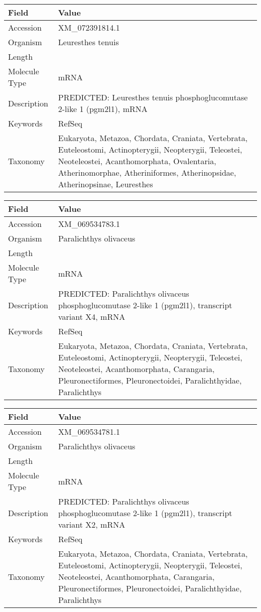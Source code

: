 \documentclass[10pt]{article}
\begin{document}
{\footnotesize
\begin{longtable}{>{\raggedright\arraybackslash}p{4.5cm} >{\raggedright\arraybackslash}p{11.5cm}}
\textbf{Field} & \textbf{Value} \\
\hline
Accession & XM\_072391814.1 \\
Organism & Leuresthes tenuis \\
Length & 3585 \\
Molecule Type & mRNA \\
Description & PREDICTED: Leuresthes tenuis phosphoglucomutase 2-like 1 (pgm2l1), mRNA \\
Keywords & RefSeq \\
Taxonomy & Eukaryota, Metazoa, Chordata, Craniata, Vertebrata, Euteleostomi, Actinopterygii, Neopterygii, Teleostei, Neoteleostei, Acanthomorphata, Ovalentaria, Atherinomorphae, Atheriniformes, Atherinopsidae, Atherinopsinae, Leuresthes \\
\end{longtable}
}

{\footnotesize
\begin{longtable}{>{\raggedright\arraybackslash}p{4.5cm} >{\raggedright\arraybackslash}p{11.5cm}}
\textbf{Field} & \textbf{Value} \\
\hline
Accession & XM\_069534783.1 \\
Organism & Paralichthys olivaceus \\
Length & 3057 \\
Molecule Type & mRNA \\
Description & PREDICTED: Paralichthys olivaceus phosphoglucomutase 2-like 1 (pgm2l1), transcript variant X4, mRNA \\
Keywords & RefSeq \\
Taxonomy & Eukaryota, Metazoa, Chordata, Craniata, Vertebrata, Euteleostomi, Actinopterygii, Neopterygii, Teleostei, Neoteleostei, Acanthomorphata, Carangaria, Pleuronectiformes, Pleuronectoidei, Paralichthyidae, Paralichthys \\
\end{longtable}
}

{\footnotesize
\begin{longtable}{>{\raggedright\arraybackslash}p{4.5cm} >{\raggedright\arraybackslash}p{11.5cm}}
\textbf{Field} & \textbf{Value} \\
\hline
Accession & XM\_069534781.1 \\
Organism & Paralichthys olivaceus \\
Length & 3167 \\
Molecule Type & mRNA \\
Description & PREDICTED: Paralichthys olivaceus phosphoglucomutase 2-like 1 (pgm2l1), transcript variant X2, mRNA \\
Keywords & RefSeq \\
Taxonomy & Eukaryota, Metazoa, Chordata, Craniata, Vertebrata, Euteleostomi, Actinopterygii, Neopterygii, Teleostei, Neoteleostei, Acanthomorphata, Carangaria, Pleuronectiformes, Pleuronectoidei, Paralichthyidae, Paralichthys \\
\end{longtable}
}
\end{document}
